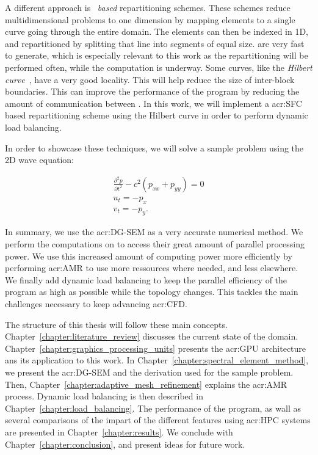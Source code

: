 A different approach is ~\textit{based} repartitioning schemes. These schemes
reduce multidimensional problems to one dimension by mapping elements to a single curve going
through the entire domain\cite{Peano1890}. The elements can then be indexed in 1D, and repartitioned
by splitting that line into segments of equal size.  are very fast to generate,
which is especially relevant to this work as the repartitioning will be performed often, while the
computation is underway. Some curves, like the \textit{Hilbert curve}~\cite{Hilbert1891}, have a
very good locality. This will help reduce the size of inter-block boundaries. This can improve the
performance of the program by reducing the amount of communication between . In
this work, we will implement a \acrshort{acr:SFC} based repartitioning scheme using the Hilbert
curve in order to perform dynamic load balancing.

In order to showcase these techniques, we will solve a sample problem using the 2D wave equation:

\begin{gather}
	\frac{\partial^2p}{\partial t^2} - c^2(p_{xx} + p_{yy}) = 0 \\
	u_t = - p_x \\
	v_t = -p_y.
\end{gather}

In summary, we use the \acrlong{acr:DG-SEM} as a very accurate numerical method. We perform the
computations on  to access their great amount of parallel processing power. We
use this increased amount of computing power more efficiently by performing \acrlong{acr:AMR} to use
more ressources where needed, and less elsewhere. We finally add dynamic load balancing to keep the
parallel efficiency of the program as high as possible while the topology changes. This tackles the
main challenges necessary to keep advancing \acrshort{acr:CFD}.

The structure of this thesis will follow these main concepts.
Chapter~\ref{chapter:literature_review} discusses the current state of the domain.
Chapter~\ref{chapter:graphics_processing_units} presents the \acrshort{acr:GPU} architecture ans its
application to this work. In Chapter~\ref{chapter:spectral_element_method}, we present the
\acrshort{acr:DG-SEM} and the derivation used for the sample problem. Then,
Chapter~\ref{chapter:adaptive_mesh_refinement} explains the \acrshort{acr:AMR} process. Dynamic load
balancing is then described in Chapter~\ref{chapter:load_balancing}. The performance of the program,
as wall as several comparisons of the impart of the different features using \acrshort{acr:HPC}
systems are presented in Chapter~\ref{chapter:results}. We conclude with
Chapter~\ref{chapter:conclusion}, and present ideas for future work.
